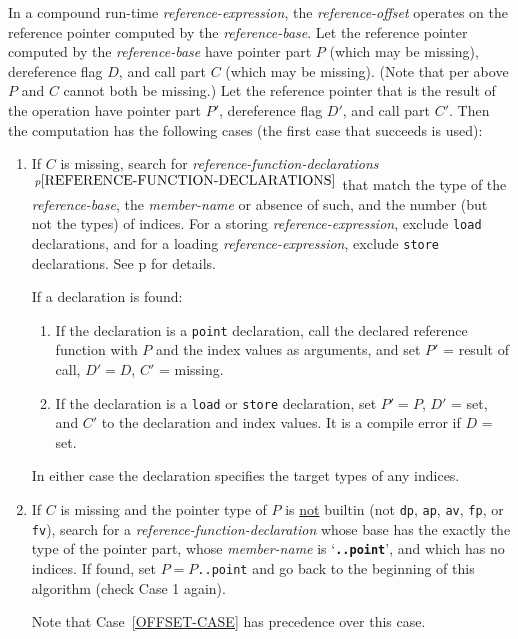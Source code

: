 \documentclass[12pt]{article}
\newcommand{\TT}[1]{{\tt \bfseries #1}}
\newcommand{\pagref}[1]{p\pageref{#1}}
\newcommand{\pagnote}[1]{$\,^{p\pageref{#1}}$}
\begin{document}
In a compound run-time {\em reference-expression}, the
{\em reference-offset} operates on the reference pointer
computed by the {\em reference-base}.  Let the reference pointer
computed by the {\em reference-base} have pointer part $P$ (which
may be missing), dereference flag $D$, and call part $C$ (which
may be missing).  (Note that per above $P$ and $C$ cannot both be
missing.)  Let the reference pointer that is the result of
the operation have pointer part $P'$,
dereference flag $D'$, and call part $C'$.  Then the computation has
the following cases (the first case that
succeeds is used):\label{RUN-TIME-FIELD-SELECTION}
\begin{enumerate}

\item\label{OFFSET-CASE}
If $C$ is missing, search for {\em reference-function-declarations}%
\pagnote{REFERENCE-FUNCTION-DECLARATIONS} that match the type of
the {\em reference-base}, the {\em member-name} or absence of such,
and the number (but not the types) of indices.  For a storing
{\em reference-expression}, exclude {\tt load} declarations, and
for a loading {\em reference-expression}, exclude {\tt store}
declarations.  See
\pagref{REFERENCE-CALL-REFERENCE-DECLARATION-OFFSET-MATCHING} for details.

If a declaration is found:
\begin{enumerate}
\item
If the declaration is a {\tt point} declaration, call the declared
reference function with $P$ and the index values as arguments,
and set $P'$ = result of call, $D' = D$, $C'$ = missing.
\item
If the declaration is a {\tt load} or {\tt store} declaration,
set $P' = P$, $D'$ = set, and $C'$ to the declaration and index values.
It is a compile error if $D$ = set.
\end{enumerate}
In either case the declaration specifies the target types of any indices.

\item\label{POINT-CASE}
If $C$ is missing and the pointer type of $P$ is \underline{not} builtin
(not {\tt dp}, {\tt ap}, {\tt av}, {\tt fp}, or {\tt fv}),
search for a {\em reference-function-declaration}
whose base has the exactly the type of the pointer part, whose
{\em member-name} is `\TT{..point}', and which has no indices.
If found, set $P=P${\tt ..point} and go back to the beginning
of this algorithm (check Case 1 again).

Note that Case~\ref{OFFSET-CASE} has precedence over this case.


\end{enumerate}
\end{document}
